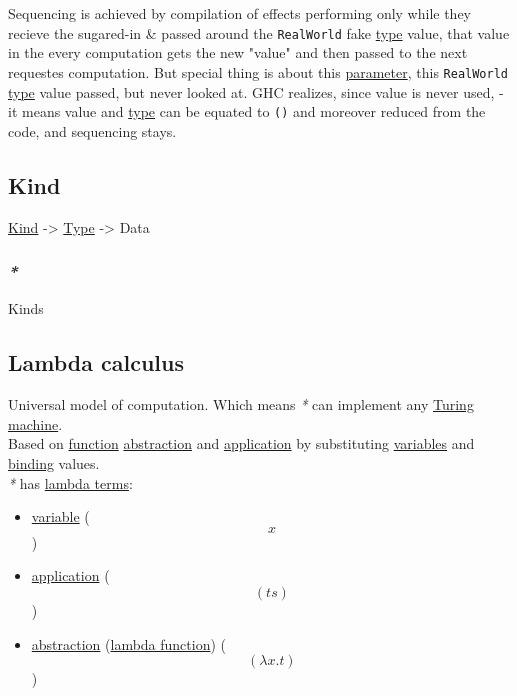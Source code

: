 \documentclass[11pt]{article}
\begin{document}
Sequencing is achieved by compilation of effects performing only while they recieve the sugared-in \& passed around the \texttt{RealWorld} fake \hyperref[orgc4aea2f]{type} value, that value in the every computation gets the new "value" and then passed to the next requestes computation. But special thing is about this \hyperref[org0e7674e]{parameter}, this \texttt{RealWorld} \hyperref[orgc4aea2f]{type} value passed, but never looked at. GHC realizes, since value is never used, - it means value and \hyperref[orgc4aea2f]{type} can be equated to \texttt{()} and moreover reduced from the code, and sequencing stays.\\

\subsection{\label{orgd0eb143}Kind}
\label{sec:orgbb80b12}
\hyperref[orgd0eb143]{Kind} -> \hyperref[orgc4aea2f]{Type} -> Data\\

\subsubsection{\emph{*}}
\label{sec:orgd7b416c}

\label{org6ff3066}Kinds\\

\subsection{\label{org37da5f9}Lambda calculus}
\label{sec:org36d612e}
Universal model of computation. Which means \emph{*} can implement any \hyperref[org2238f80]{Turing machine}.\\
Based on \hyperref[orge15bc14]{function} \hyperref[org3470ee4]{abstraction} and \hyperref[org2b89e66]{application} by substituting \hyperref[orge17f54f]{variables} and \hyperref[org6b75da3]{binding} values.\\

\emph{*} has \hyperref[org7b94fd3]{lambda terms}:\\
\begin{itemize}
\item \hyperref[org0b57594]{variable} ($$ x $$)\\
\item \hyperref[org2b89e66]{application} ($$ (ts) $$)\\
\item \hyperref[org3470ee4]{abstraction} (\hyperref[orgaf59855]{lambda function}) ($$ (\lambda x . t) $$)\\
\end{itemize}
\end{document}
